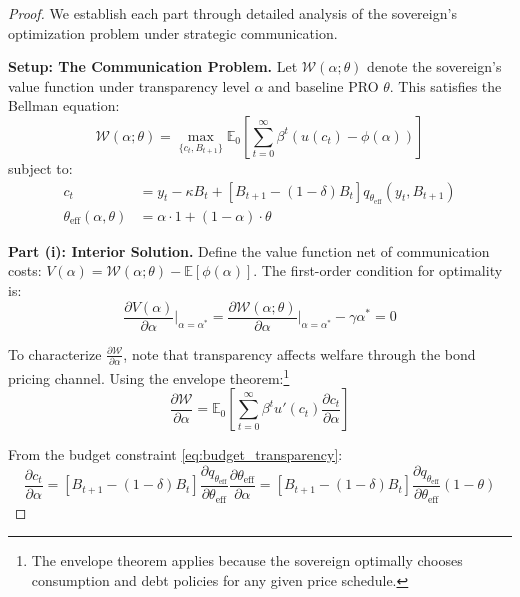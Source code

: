 \documentclass[12pt]{article}
\theoremstyle{plain}
\begin{document}
\begin{proof}
	We establish each part through detailed analysis of the sovereign's optimization problem under strategic communication.

	\textbf{Setup: The Communication Problem.}
	Let $\mathcal{W}(\alpha; \theta)$ denote the sovereign's value function under transparency level $\alpha$ and baseline PRO $\theta$. This satisfies the Bellman equation:
	\begin{equation}
		\mathcal{W}(\alpha; \theta) = \max_{\{c_t, B_{t+1}\}} \mathbb{E}_0 \left[ \sum_{t=0}^\infty \beta^t \left( u(c_t) - \phi(\alpha) \right) \right] \label{eq:welfare_transparency}
	\end{equation}
	subject to:
	\begin{align}
		c_t                                 & = y_t - \kappa B_t + [B_{t+1} - (1-\delta)B_t] q_{\theta_{\text{eff}}}(y_t, B_{t+1}) \label{eq:budget_transparency} \\
		\theta_{\text{eff}}(\alpha, \theta) & = \alpha \cdot 1 + (1-\alpha) \cdot \theta \label{eq:effective_theta_proof}
	\end{align}

	\textbf{Part (i): Interior Solution.}
	Define the value function net of communication costs: $V(\alpha) = \mathcal{W}(\alpha; \theta) - \mathbb{E}[\phi(\alpha)]$. The first-order condition for optimality is:
	\begin{equation}
		\frac{\partial V(\alpha)}{\partial \alpha}\bigg|_{\alpha=\alpha^*} = \frac{\partial \mathcal{W}(\alpha; \theta)}{\partial \alpha}\bigg|_{\alpha=\alpha^*} - \gamma \alpha^* = 0 \label{eq:foc_detailed}
	\end{equation}

	To characterize $\frac{\partial \mathcal{W}}{\partial \alpha}$, note that
	transparency affects welfare through the bond pricing channel. Using the
	envelope theorem:\footnote{The envelope theorem applies because the sovereign
		optimally chooses consumption and debt policies for any given price schedule.}
	\begin{equation}
		\frac{\partial \mathcal{W}}{\partial \alpha} = \mathbb{E}_0 \left[ \sum_{t=0}^\infty \beta^t u'(c_t) \frac{\partial c_t}{\partial \alpha} \right] \label{eq:welfare_derivative}
	\end{equation}

	From the budget constraint \eqref{eq:budget_transparency}:
	\begin{equation}
		\frac{\partial c_t}{\partial \alpha} = [B_{t+1} - (1-\delta)B_t] \frac{\partial q_{\theta_{\text{eff}}}}{\partial \theta_{\text{eff}}} \frac{\partial \theta_{\text{eff}}}{\partial \alpha} = [B_{t+1} - (1-\delta)B_t] \frac{\partial q_{\theta_{\text{eff}}}}{\partial \theta_{\text{eff}}} (1-\theta) \label{eq:consumption_derivative_alpha}
	\end{equation}


\end{proof}
\end{document}
